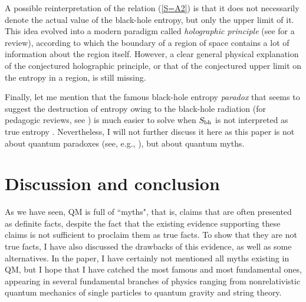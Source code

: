 \documentclass[12pt]{article}
\begin{document}
A possible reinterpretation of the relation (\ref{S=A2}) 
is that it does not necessarily denote the actual 
value of the black-hole entropy, but only the upper limit
of it. This idea evolved into a modern paradigm 
called {\em holographic principle} (see \cite{bousso} for a review), 
according to which the boundary of a region of space contains a lot 
of information about the region itself. However, a 
clear general physical explanation of the 
conjectured holographic principle, or that of the conjectured upper limit
on the entropy in a region, is still missing.   

Finally, let me mention that the famous 
black-hole entropy {\em paradox} that seems to suggest 
the destruction of entropy owing to the black-hole 
radiation (for pedagogic reviews, see \cite{gidd,stro}) 
is much easier to solve 
when $S_{\rm bh}$ is not interpreted as true entropy \cite{nikolbh}.  
Nevertheless, I will 
not further discuss it here as this paper is not about
quantum paradoxes (see, e.g., \cite{laloe}), but about quantum myths.

\section{Discussion and conclusion}

As we have seen, QM is full of ``myths", 
that is, claims that are often presented as definite facts, despite
the fact that the existing evidence supporting these claims
is not sufficient to proclaim them as true facts. 
To show that they are not true facts, I have also discussed the 
drawbacks of this evidence, as well as some alternatives.
In the paper, I have certainly not mentioned all myths existing
in QM, but I hope that I have catched the most famous
and most fundamental ones, appearing in several fundamental branches
of physics ranging from
nonrelativistic quantum mechanics of single particles to
quantum gravity and string theory.
\end{document}
